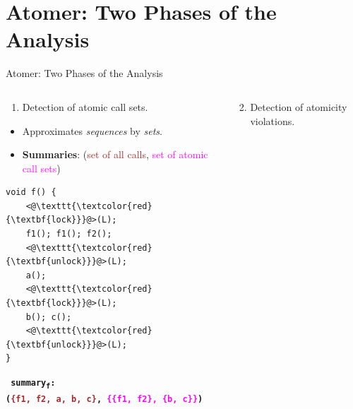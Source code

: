 \documentclass[%
    10pt, xcolor=pdflatex, hyperref={unicode}, aspectratio=169%
]{beamer}
\begin{document}
\section{Atomer: Two Phases of the Analysis}
\begin{frame}[fragile]{Atomer: Two Phases of the Analysis}
    \begin{columns}
        \begin{column}[T]{.5 \linewidth}
            \centering

            \begin{enumerate}
                \item
                    Detection of \alert{atomic call sets}.
            \end{enumerate}

            \begin{itemize}
                \item
                    Approximates \emph{sequences} by \emph{sets}.

                \item
                    \textbf{Summaries}: (\textcolor{brown}{set of all
                    calls}, \textcolor{magenta}{set of atomic call sets})
            \end{itemize}

            \begin{lstlisting}
void f() {
    <@\texttt{\textcolor{red}{\textbf{lock}}}@>(L);
    f1(); f1(); f2();
    <@\texttt{\textcolor{red}{\textbf{unlock}}}@>(L);
    a();
    <@\texttt{\textcolor{red}{\textbf{lock}}}@>(L);
    b(); c();
    <@\texttt{\textcolor{red}{\textbf{unlock}}}@>(L);
}
            \end{lstlisting}

            \textbf{\texttt{\footnotesize
                \alert{summary\textsubscript{f}}: \\
                (\textcolor{brown}{\{f1, f2, a, b, c\}},
                \textcolor{magenta}{\{\{f1, f2\}, \{b, c\}\}})
            }}
        \end{column}

        \begin{column}[T]{.5 \linewidth}
            \centering

            \begin{enumerate}\setcounter{enumi}{1}
                \item
                    Detection of \alert{atomicity violations}.
            \end{enumerate}


\end{column}
\end{columns}
\end{frame}
\end{document}
